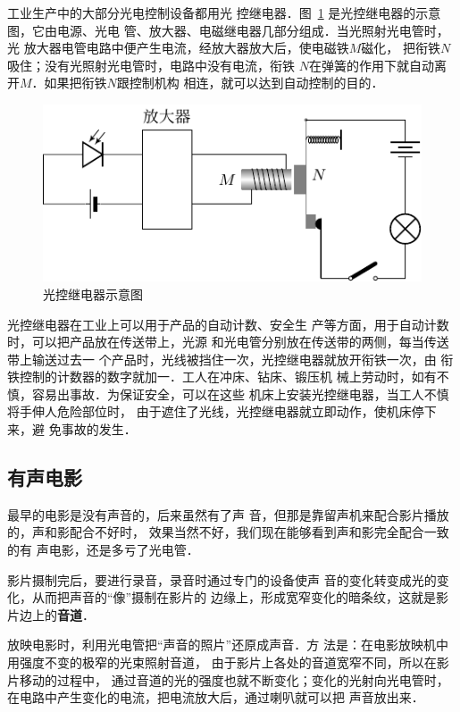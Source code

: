 工业生产中的大部分光电控制设备都用光
控继电器．图~\ref{fig_C_7-4} 是光控继电器的示意图，它由电源、光电
管、放大器、电磁继电器几部分组成．当光照射光电管时，光
放大器电管电路中便产生电流，经放大器放大后，使电磁铁$M$磁化，
把衔铁$N$吸住；没有光照射光电管时，电路中没有电流，衔铁
$N$在弹簧的作用下就自动离开$M$．如果把衔铁$N$跟控制机构
相连，就可以达到自动控制的目的．
\begin{figure}[htbp]
    \centering
    \includegraphics{fig/C/7-4.pdf}
    \caption{光控继电器示意图}\label{fig_C_7-4}
\end{figure}


光控继电器在工业上可以用于产品的自动计数、安全生
产等方面，用于自动计数时，可以把产品放在传送带上，光源
和光电管分别放在传送带的两侧，每当传送带上输送过去一
个产品时，光线被挡住一次，光控继电器就放开衔铁一次，由
衔铁控制的计数器的数字就加一．工人在冲床、钻床、锻压机
械上劳动时，如有不慎，容易出事故．为保证安全，可以在这些
机床上安装光控继电器，当工人不慎将手伸人危险部位时，
由于遮住了光线，光控继电器就立即动作，使机床停下来，避
免事故的发生．


\subsection{有声电影}

最早的电影是没有声音的，后来虽然有了声
音，但那是靠留声机来配合影片播放的，声和影配合不好时，
效果当然不好，我们现在能够看到声和影完全配合一致的有
声电影，还是多亏了光电管．

影片摄制完后，要进行录音，录音时通过专门的设备使声
音的变化转变成光的变化，从而把声音的“像”摄制在影片的
边缘上，形成宽窄变化的暗条纹，这就是影片边上的\textbf{音道}．

放映电影时，利用光电管把“声音的照片”还原成声音．方
法是：在电影放映机中用强度不变的极窄的光束照射音道，
由于影片上各处的音道宽窄不同，所以在影片移动的过程中，
通过音道的光的强度也就不断变化；变化的光射向光电管时，
在电路中产生变化的电流，把电流放大后，通过喇叭就可以把
声音放出来．

